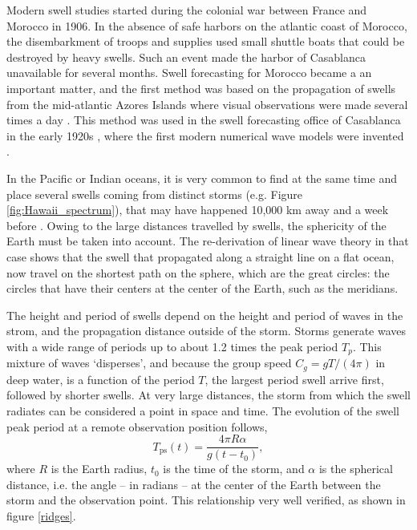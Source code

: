 Modern swell studies started during the colonial war between France and Morocco in 1906. In the absence of safe harbors on the atlantic coast of Morocco, the disembarkment of troops and supplies used small shuttle boats that could be destroyed by heavy swells. Such an event made the harbor of Casablanca unavailable for several months. 
Swell forecasting for Morocco became a an important matter, and the first method was based on 
the propagation of swells from the mid-atlantic Azores Islands where visual observations were made several times a day \citep{Gain1918}. 
This method was used in the swell forecasting office of Casablanca in the early 1920s \citep{Montagne1922}, where the first modern numerical wave models were invented \citep{Gelci&al.1957}. 

In the Pacific or Indian oceans, it is very common to find at the same time and place 
 several swells coming from distinct storms (e.g. Figure \ref{fig:Hawaii_spectrum}), that may have happened 10,000 km away and a week before \citep{Darbyshire1957, Munk&al.1963}. 
Owing to the large distances travelled by swells, the sphericity of the Earth must be taken into account. The re-derivation of linear wave theory in that case 
shows that the swell that propagated along a straight line on a flat ocean, now travel on the shortest path on the sphere, which are the great circles:  
the circles that have their centers at the center of the Earth, such as the meridians. 

The height and period of swells depend on the height and period of waves in the strom, and the propagation distance outside of the storm. Storms generate waves with a wide range of periods up to about 1.2 times the peak period $T_p$. This mixture of waves `disperses', and because the group speed $C_g=g T/(4 \pi)$  in deep water, is a function of the period $T$, 
the largest period swell arrive first, followed by shorter swells. 
At very large distances, the storm from which the swell radiates can be considered a point in 
space and time. The evolution of the swell peak period at a remote observation position follows, 
\begin{equation}
T_{\mathrm{ps}} (t) = \frac{4\pi R \alpha }{g(t-t_0)},
\label{prev lin1}
\end{equation}
where $R$ is the Earth radius, $t_0$ is the time of the storm, and $\alpha$ is the spherical distance, i.e. the angle -- in radians -- at the center of the Earth between the storm and the observation point. This relationship very well verified, as shown in figure \ref{ridges}.


